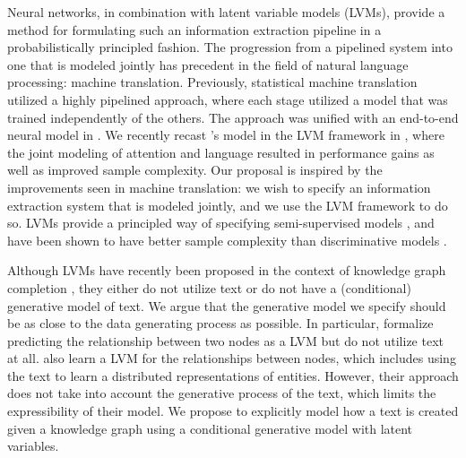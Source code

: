 \documentclass[12pt]{article}
\begin{document}
Neural networks, in combination with latent variable models (LVMs),
provide a method for formulating such an information extraction pipeline
in a probabilistically principled fashion.
The progression from a pipelined system into one that is modeled jointly
has precedent in the field of natural language processing: machine translation.
Previously, statistical machine translation utilized a highly pipelined approach,
where each stage utilized a model that was trained independently of the others.
The approach was unified with an end-to-end neural model in \citet{bahdanau2014mt}.
We recently recast \citet{bahdanau2014mt}'s model in the LVM framework in
\citet{deng2018attn}, where the joint modeling of attention and language
resulted in performance gains as well as improved sample complexity.
Our proposal is inspired by the improvements seen in machine translation:
we wish to specify an information extraction system that is modeled jointly,
and we use the LVM framework to do so.
LVMs provide a principled way of specifying semi-supervised models \citep{kingma2014ssvae},
and have been shown to have better sample complexity than discriminative models
\citep{deng2018attn,ng2001discgen}.

Although LVMs have recently been proposed in the context of knowledge graph
completion \citep{chen2018diva,qu2017ssre}, they either do not utilize text
or do not have a (conditional) generative model of text.
We argue that the generative model we specify should be as close to 
the data generating process as possible.
In particular, \citet{chen2018diva} formalize predicting the relationship between two nodes
as a LVM but do not utilize text at all.
\citet{qu2017ssre} also learn a LVM for the relationships between nodes,
which includes using the text to learn a distributed representations of entities.
However, their approach does not take into account the generative process of the text,
which limits the expressibility of their model.
We propose to explicitly model how a text is created given a knowledge graph
using a conditional generative model with latent variables.
\end{document}
